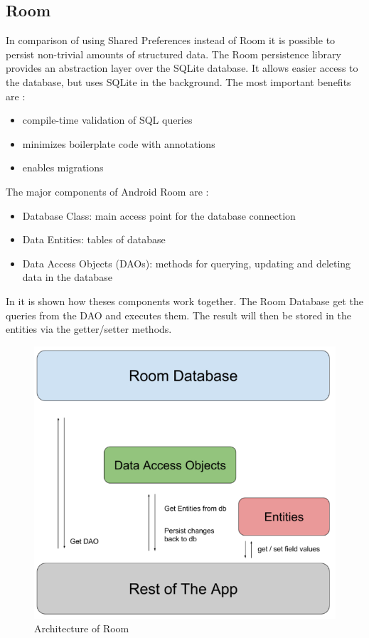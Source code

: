 \subsection{Room}
\label{cha:room}

In comparison of using Shared Preferences instead of Room it is possible to persist non-trivial amounts of structured data. The Room persistence library provides an abstraction layer over the SQLite database. It allows easier access to the database, but uses SQLite in the background.
The most important benefits are \cite{android_room}:

\begin{itemize}
    \item compile-time validation of SQL queries
    \item minimizes boilerplate code with annotations
    \item enables migrations \\
\end{itemize}

\noindent
The major components of Android Room are \cite{android_room}:

\begin{itemize}
    \item Database Class: main access point for the database connection
    \item Data Entities: tables of database
    \item Data Access Objects (DAOs): methods for querying, updating and deleting data in the database \\
\end{itemize}

In \cite{Figure_2} it is shown how theses components work together. The Room Database get the queries from the DAO and executes them. The result will then be stored in the entities via the getter/setter methods.

\begin{figure}[ht]
    \includegraphics[width=\linewidth]{images/room_architecture.png}
    \caption{Architecture of Room \cite{Figure_2}}
    \label{fig:room_architecture}
\end{figure}

